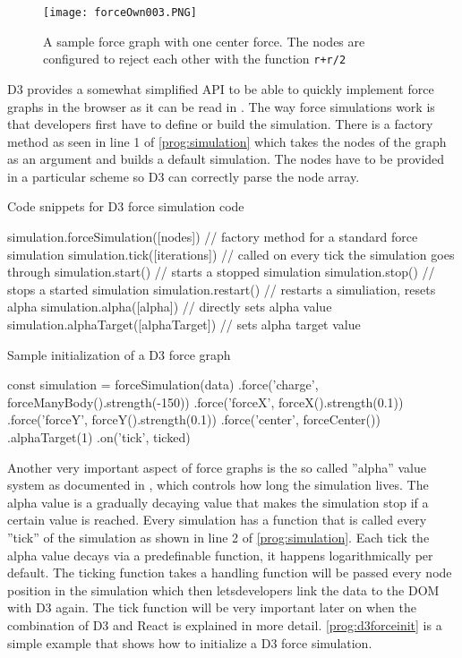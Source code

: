 \begin{figure}
  \centering
  \texttt{[image: forceOwn003.PNG]}
  \caption{A sample force graph with one center force. The nodes are configured to reject each other with the function \texttt{r+r/2}}
  \label{fig:force004}
\end{figure}

D3 provides a somewhat simplified API to be able to quickly implement force graphs in the browser as it can be read in \cite[/d3-force/blob/master/README.md]{D3Github}. The way force simulations work is that developers first have to define or build the simulation. There is a factory method as seen in line 1 of \ref{prog:simulation} which takes the nodes of the graph as an argument and builds a default simulation. The nodes have to be provided in a particular scheme so D3 can correctly parse the node array. 

\begin{program}
\caption{Code snippets for D3 force simulation code}
\label{prog:simulation}
\begin{JsCode}
simulation.forceSimulation([nodes]) // factory method for a standard force simulation
simulation.tick([iterations]) // called on every tick the simulation goes through
simulation.start() // starts a stopped simulation
simulation.stop() // stops a started simulation
simulation.restart() // restarts a simuliation, resets alpha
simulation.alpha([alpha]) // directly sets alpha value
simulation.alphaTarget([alphaTarget]) // sets alpha target value
\end{JsCode}
\end{program}

\begin{program}
\caption{Sample initialization of a D3 force graph}
\label{prog:d3forceinit}
\begin{JsCode}
const simulation = forceSimulation(data)
  .force('charge', forceManyBody().strength(-150))
  .force('forceX', forceX().strength(0.1))
  .force('forceY', forceY().strength(0.1))
  .force('center', forceCenter())
  .alphaTarget(1)
  .on('tick', ticked)
\end{JsCode}
\end{program}

Another very important aspect of force graphs is the so called ''alpha'' value system as documented in \cite[/d3-force/blob/master/README.md]{D3Github}, which controls how long the simulation lives. The alpha value is a gradually decaying value that makes the simulation stop if a certain value is reached. Every simulation has a function that is called every ''tick'' of the simulation as shown in line 2 of \ref{prog:simulation}. Each tick the alpha value decays via a predefinable function, it happens logarithmically per default. The ticking function takes a handling function will be passed every node position in the simulation which then letsdevelopers link the data to the DOM with D3 again. The tick function will be very important later on when the combination of D3 and React is explained in more detail. \ref{prog:d3forceinit} is a simple example that shows how to initialize a D3 force simulation.

